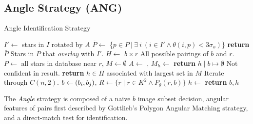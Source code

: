 \subsection{Angle Strategy (ANG)}\label{subsec:angleMethod}
\newcommand{\invalidBijection}{\If{$\forall \ \vv{b^\star}, \ \vv{b^\star} \in b \land h\left(\vv{b^\star}\right)
\neq \emptyset$}}
\begin{algorithm}
    \caption{Angle Identification Strategy} \label{algorithm:angleIdentification}
    \begin{algorithmic}[1]
        \State $I' \gets$ stars in $I$ rotated by $A$
        \State $\bar{P} \gets $ \{$p \in P \ | \ \exists \ i \ (i \in I' \land \theta (i, p) < 3\sigma_o)$\}
        \State \textbf{return} $\bar{P}$ \Comment Stars in $P$ that \textit{overlay} with $I'$.
        \EndFunction
        \State $H \gets $ $b \times r$ \Comment All possible pairings of $b$ and $r$.
        \State $P \gets $ all stars in database near $r$, $M \gets \emptyset$
        \State $A \gets $ , $M_h \gets $ 
        \EndFor
        \State \textbf{return} $h \mid b \mapsto \emptyset $ \Comment Not confident in result.
        \Else
        \State \textbf{return} $h \in H$ associated with largest set in $M$
        \EndIf
        \EndFunction
         \Comment Iterate through $C(n, 2)$. \label{algline:angleI}
         \label{algline:angleJ}
        \State $b \gets \left(b_i, b_j\right)$, $R \gets \{ r \mid r \in K^2 \land P_\theta(r, b) \}$
        \State $h \gets $  %
        \invalidBijection
        \State \textbf{return} $b, h$
        \EndIf
        \EndIf
        \EndFor
        \EndFor
        \EndFunction
    \end{algorithmic}
\end{algorithm}

The \textit{Angle} strategy is composed of a naive $b$ image subset decision, angular features of pairs first described
by Gottlieb's Polygon Angular Matching strategy, and a direct-match test for identification.

